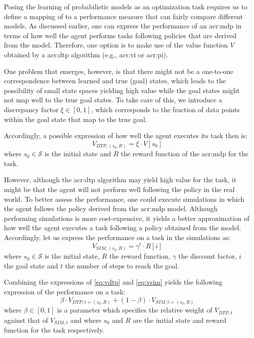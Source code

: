 Posing the learning of probabilistic models as an optimization task requires us to define a mapping of  to a performance measure that can fairly compare different models.
As discussed earlier, one can express the performance of an \acrshort{acr:mdp} in terms of how well the agent performs tasks following policies that are derived from the model.
Therefore, one option is to make use of the value function $V$ obtained by a \acrshort{acr:dtp} algorithm (e.g., \acrshort{acr:vi} or \acrshort{acr:pi}).

One problem that emerges, however, is that there might not be a one-to-one correspondence between learned and true (goal) states, which leads to the possibility of small state spaces yielding high value while the goal states might not map well to the true goal states.
To take care of this, we introduce a discrepancy factor $\xi \in [0, 1]$, which corresponds to the fraction of data points within the goal state that map to the true goal.

Accordingly, a possible expression of how well the agent executes its task then is:
\begin{equation}
\label{eq:vdtp}
V_{\mathit{DTP},(s_0,R)} = \xi \cdot V[s_0]
\end{equation}
where $s_0 \in \mathcal{S}$ is the initial state and $R$ the reward function of the \acrshort{acr:mdp} for the task.

However, although the \acrshort{acr:dtp} algorithm may yield high value for the task, it might be that the agent will not perform well following the policy in the real world.
To better assess the performance, one could execute simulations in which the agent follows the policy derived from the \acrshort{acr:mdp} model.
Although performing simulations is more cost-expensive, it yields a better approximation of how well the agent executes a task following a policy obtained from the model.
Accordingly, let us express the performance on a task in the simulations as:
\begin{equation}
\label{eq:vsim}
V_{\mathit{SIM}, (s_0, R)} = \gamma^{t} \cdot R[i]
\end{equation}
where $s_0 \in \mathcal{S}$ is the initial state, $R$ the reward function, $\gamma$ the discount factor, $i$ the goal state and $t$ the number of steps to reach the goal.

Combining the expressions of \autoref{eq:vdtp} and \autoref{eq:vsim} yields the following expression of the performance on a task:
\begin{equation}
\label{eq:vcom}
\beta \cdot V_{\mathit{DTP}, t=(s_0, R)} + (1 - \beta) \cdot V_{\mathit{SIM}, t=(s_0, R)}
\end{equation}
where $\beta \in [0, 1]$ is a parameter which specifies the relative weight of $V_{\mathit{DTP}, t}$ against that of $V_{\mathit{SIM}, t}$ and where $s_0$ and $R$ are the initial state and reward function for the task respectively.

